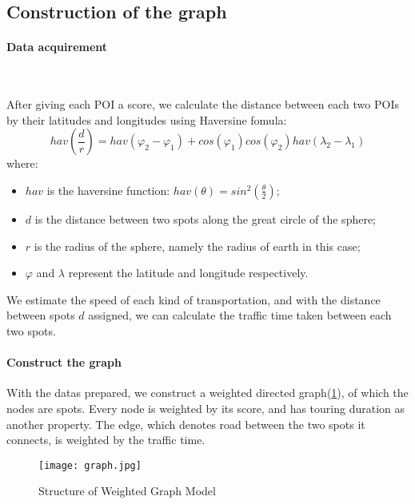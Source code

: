 \documentclass{mcmthesis}
\begin{document}
\subsection{Construction of the graph}
  \paragraph{Data acquirement} \

  After giving each POI a score, we calculate the distance between each two POIs by their latitudes and longitudes using Haversine fomula:
  \[
    hav(\frac{d}{r}) = hav(\varphi_{2}-\varphi_{1}) + cos(\varphi_{1})cos(\varphi_{2})hav(\lambda_{2}-\lambda_{1})
  \]
  where:
  \begin{itemize}
    \item $hav$ is the haversine function: $hav(\theta) = sin^{2}(\frac{\theta}{2})$;
    \item $d$ is the distance between two spots along the great circle of the sphere;
    \item $r$ is the radius of the sphere, namely the radius of earth in this case;
    \item $\varphi$ and $\lambda$ represent the latitude and longitude respectively.
  \end{itemize} 
  We estimate the speed of each kind of transportation, and with the distance between spots $d$ assigned, we can calculate the traffic time taken between each two spots. \par
  \paragraph{Construct the graph} 

  With the datas prepared, we construct a weighted directed graph(\ref{fig:graph}), of which the nodes are spots. Every node is weighted by its score, and has touring duration as another property. The edge, which denotes road between the two spots it connects, is weighted by the traffic time.
  \begin{figure}[ht]
    \centering
    \texttt{[image: graph.jpg]}
    \caption{Structure of Weighted Graph Model}
    \label{fig:graph}
  \end{figure}

\end{document}
